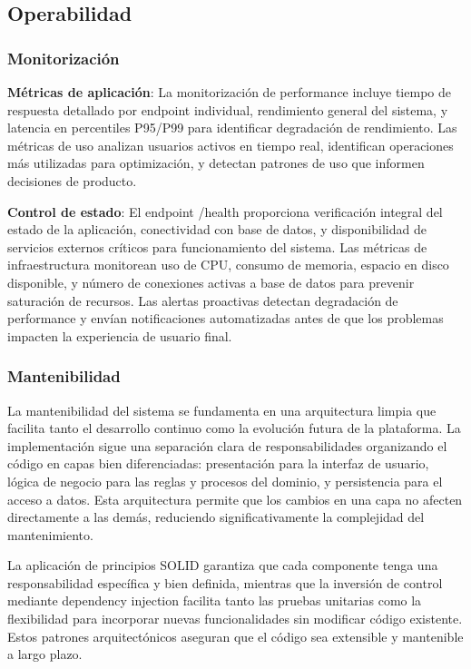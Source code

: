 \documentclass[12pt,a4paper,oneside]{report}
\begin{document}
\subsection{Operabilidad}\label{operabilidad}

\subsubsection{Monitorización}\label{monitorizaciuxf3n}

\textbf{Métricas de aplicación}: La monitorización de performance incluye tiempo de respuesta detallado por endpoint individual, rendimiento general del sistema, y latencia en percentiles P95/P99 para identificar degradación de rendimiento. Las métricas de uso analizan usuarios activos en tiempo real, identifican operaciones más utilizadas para optimización, y detectan patrones de uso que informen decisiones de producto.

\textbf{Control de estado}: El endpoint /health proporciona verificación integral del estado de la aplicación, conectividad con base de datos, y disponibilidad de servicios externos críticos para funcionamiento del sistema. Las métricas de infraestructura monitorean uso de CPU, consumo de memoria, espacio en disco disponible, y número de conexiones activas a base de datos para prevenir saturación de recursos. Las alertas proactivas detectan degradación de performance y envían notificaciones automatizadas antes de que los problemas impacten la experiencia de usuario final.

\subsubsection{Mantenibilidad}\label{mantenibilidad}

La mantenibilidad del sistema se fundamenta en una arquitectura limpia que facilita tanto el desarrollo continuo como la evolución futura de la plataforma. La implementación sigue una separación clara de responsabilidades organizando el código en capas bien diferenciadas: presentación para la interfaz de usuario, lógica de negocio para las reglas y procesos del dominio, y persistencia para el acceso a datos. Esta arquitectura permite que los cambios en una capa no afecten directamente a las demás, reduciendo significativamente la complejidad del mantenimiento.

La aplicación de principios SOLID garantiza que cada componente tenga una responsabilidad específica y bien definida, mientras que la inversión de control mediante dependency injection facilita tanto las pruebas unitarias como la flexibilidad para incorporar nuevas funcionalidades sin modificar código existente. Estos patrones arquitectónicos aseguran que el código sea extensible y mantenible a largo plazo.
\end{document}

